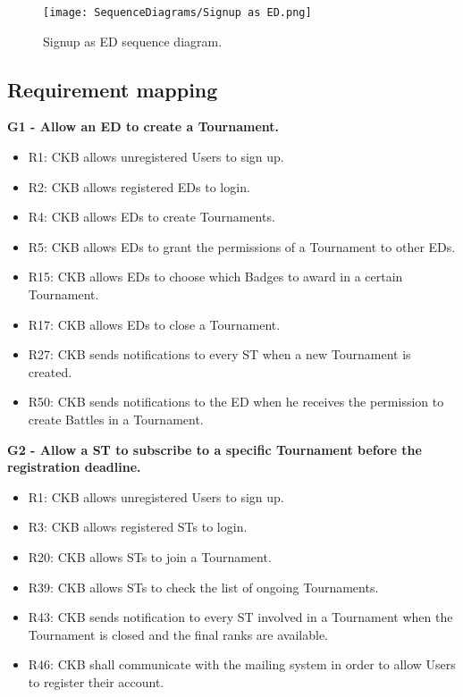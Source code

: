 \begin{figure}[H]
    \begin{center}
        \texttt{[image: SequenceDiagrams/Signup as ED.png]}
        \caption{Signup as ED sequence diagram.}
        \label{fig:signup_as_ED_seqd}%
    \end{center}
\end{figure}

\newpage

\subsection{Requirement mapping}
\label{subsec:requirement_mapping}%
\textbf{G1 - Allow an ED to create a Tournament.}
\begin{itemize}
    \item R1: CKB allows unregistered Users to sign up.
    \item R2: CKB allows registered EDs to login.
    \item R4: CKB allows EDs to create Tournaments.
    \item R5: CKB allows EDs to grant the permissions of a Tournament to other EDs.
    \item R15: CKB allows EDs to choose which Badges to award in a certain Tournament.
    \item R17: CKB allows EDs to close a Tournament.
    \item R27: CKB sends notifications to every ST when a new Tournament is created.
    \item R50: CKB sends notifications to the ED when he receives the permission to create Battles in a Tournament.
\end{itemize}

\vspace{1.5cm}
\textbf{G2 - Allow a ST to subscribe to a specific Tournament before the registration deadline.}
\begin{itemize}
    \item R1: CKB allows unregistered Users to sign up.
    \item R3: CKB allows registered STs to login.
    \item R20: CKB allows STs to join a Tournament.
    \item R39: CKB allows STs to check the list of ongoing Tournaments.
    \item R43: CKB sends notification to every ST involved in a Tournament when the Tournament is closed and the final ranks are available.
    \item R46: CKB shall communicate with the mailing system in order to allow Users to register their account.
\end{itemize}


